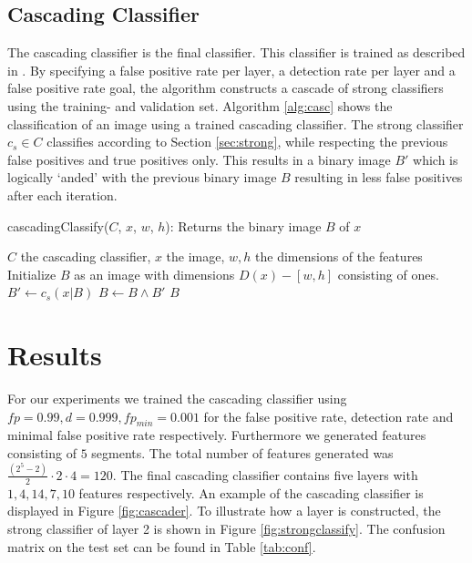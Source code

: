 \documentclass[a4paper,11pt]{article}
\begin{document}
\subsection{Cascading Classifier} \label{sec:casc}
The cascading classifier is the final classifier. This classifier is trained as
described in \cite{viola}. By specifying a false positive rate per layer, a
detection rate per layer and a false positive rate goal, the algorithm
constructs a cascade of strong classifiers using the training- and validation
set.  Algorithm \ref{alg:casc} shows the classification of an image using a
trained cascading classifier. The strong classifier $c_s \in C$ classifies
according to Section \ref{sec:strong}, while respecting the previous false
positives and true positives only. This results in a binary image $B'$ which is
logically `anded' with the previous binary image $B$ resulting in less false
positives after each iteration.
\begin{algorithm}[!htb]
	\caption{cascadingClassify($C$, $x$, $w$, $h$): Returns the binary image $B$ of $x$}
	\begin{algorithmic}[1]
	\REQUIRE $C$ the cascading classifier, $x$ the image, $w,h$ the dimensions of the features
	\medskip
	\STATE Initialize $B$ as an image with dimensions $D(x) - [w,h]$ consisting of ones.
		\STATE $B' \leftarrow c_s(x|B)$
		\STATE $B \leftarrow B \land B'$
	\ENDFOR
	\RETURN $B$
	\end{algorithmic}
\label{alg:casc}
\end{algorithm}

\section{Results} \label{sec:res}
For our experiments we trained the cascading classifier using $fp = 0.99, d =
0.999, fp_{min} = 0.001$ for the false positive rate, detection rate and
minimal false positive rate respectively. Furthermore we generated features
consisting of $5$ segments. The total number of features generated was
$\frac{(2^5-2)}{2}\cdot 2 \cdot 4 = 120$. The final cascading classifier
contains five layers with $1, 4, 14, 7, 10$ features respectively. An example
of the cascading classifier is displayed in Figure \ref{fig:cascader}. To
illustrate how a layer is constructed, the strong classifier of layer 2 is
shown in Figure \ref{fig:strongclassify}. The confusion matrix on the test set
can be found in Table \ref{tab:conf}. 
\end{document}
